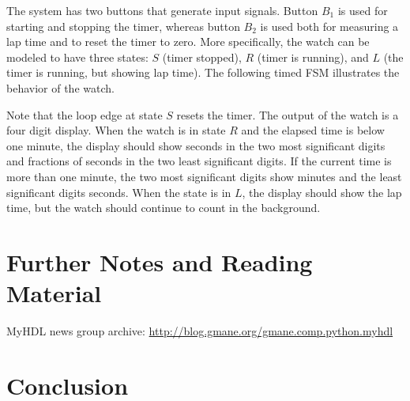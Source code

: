 \documentclass[10pt, technote, draftcls, onecolumn]{IEEEtran}
\newcommand{\comment}[3]{\paragraph*{\textbf{#1}}{\color{#3}#2}}
\newcommand{\martin}[1]{\comment{Martin}{#1}{Blue}}
\begin{document}
The system has two buttons that generate input signals. Button $B_1$
is used for starting and stopping the timer, whereas button $B_2$ is
used both for measuring a lap time and to reset the timer to zero. More
specifically, the watch can be modeled to have three states: $S$
(timer stopped), $R$ (timer is running), and $L$ (the timer is
running, but showing lap time). The following timed FSM illustrates
the behavior of the watch.\\



Note that the loop edge at state $S$ resets the timer. The output
of the watch is a four digit display. When the watch is in state
$R$ and the elapsed time is below one minute, the display should show
seconds in the two most significant digits and fractions of seconds in
the two least significant digits. If the current time is more than one
minute, the two most significant digits show minutes and the least
significant digits seconds. When the state is in $L$, the display
should show the lap time, but the watch should continue to count in
the background.


\section{Further Notes and Reading Material}

MyHDL news group archive: \url{http://blog.gmane.org/gmane.comp.python.myhdl}


% 



\section{Conclusion}
\label{sec:conclusion}
\end{document}
